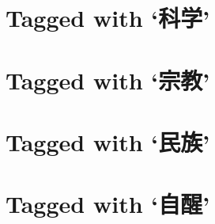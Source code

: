 \section*{Tagged with `\textbf{科学}'}

\section*{Tagged with `\textbf{宗教}'}

\section*{Tagged with `\textbf{民族}'}

\section*{Tagged with `\textbf{自醒}'}
